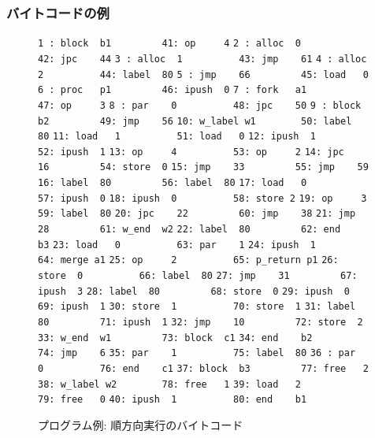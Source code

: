 \documentclass[submit,PRO]{ipsj}
\def\|{\verb|}
\begin{document}
\subsubsection{バイトコードの例}

\begin{figure}[tb]
\vbox{
\hbox{\|1 : block  b1         41: op     4|}
\hbox{\|2 : alloc  0          42: jpc    44|}
\hbox{\|3 : alloc  1          43: jmp    61|}
\hbox{\|4 : alloc  2          44: label  80|}
\hbox{\|5 : jmp    66         45: load   0|}
\hbox{\|6 : proc   p1         46: ipush  0|}
\hbox{\|7 : fork   a1         47: op     3|}
\hbox{\|8 : par    0          48: jpc    50|}
\hbox{\|9 : block  b2         49: jmp    56|}
\hbox{\|10: w_label w1        50: label  80|}
\hbox{\|11: load   1          51: load   0|}
\hbox{\|12: ipush  1          52: ipush  1|}
\hbox{\|13: op     4          53: op     2|}
\hbox{\|14: jpc    16         54: store  0|}
\hbox{\|15: jmp    33         55: jmp    59|}
\hbox{\|16: label  80         56: label  80|}
\hbox{\|17: load   0          57: ipush  0|}
\hbox{\|18: ipush  0          58: store 2|}
\hbox{\|19: op     3          59: label  80|}
\hbox{\|20: jpc    22         60: jmp    38|}
\hbox{\|21: jmp    28         61: w_end  w2|}
\hbox{\|22: label  80         62: end    b3|}
\hbox{\|23: load   0          63: par    1|}
\hbox{\|24: ipush  1          64: merge a1|}
\hbox{\|25: op     2          65: p_return p1|}
\hbox{\|26: store  0          66: label  80|}
\hbox{\|27: jmp    31         67: ipush  3|}
\hbox{\|28: label  80         68: store  0|}
\hbox{\|29: ipush  0          69: ipush  1|}
\hbox{\|30: store  1          70: store  1|}
\hbox{\|31: label  80         71: ipush  1|}
\hbox{\|32: jmp    10         72: store  2|}
\hbox{\|33: w_end  w1         73: block  c1|}
\hbox{\|34: end    b2         74: jmp    6|}
\hbox{\|35: par    1          75: label  80|}
\hbox{\|36 : par   0          76: end    c1|}
\hbox{\|37: block  b3         77: free   2|}
\hbox{\|38: w_label w2        78: free   1|}
\hbox{\|39: load   2          79: free   0|}
\hbox{\|40: ipush  1          80: end    b1|}
}
\centerline{}
\caption{プログラム例: 順方向実行のバイトコード}
\label{fig:bytecode}
\end{figure}
\end{document}
